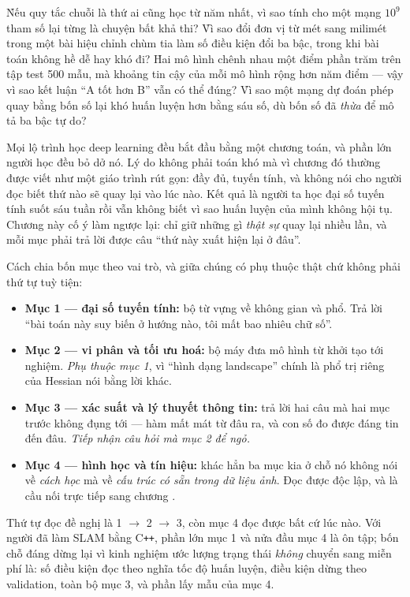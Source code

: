 \documentclass[../../deep_learning.tex]{subfiles}
\begin{document}
\begin{khoigoi}
\h{Nếu quy tắc chuỗi là thứ ai cũng học từ năm nhất, vì sao tính  cho một mạng \(10^9\) tham số lại từng là chuyện bất khả thi?}
\h{Vì sao đổi đơn vị từ mét sang milimét trong một bài hiệu chỉnh chùm tia làm số điều kiện đổi ba bậc, trong khi bài toán không hề dễ hay khó đi?}
\h{Hai mô hình chênh nhau một điểm phần trăm trên tập test 500 mẫu, mà khoảng tin cậy của mỗi mô hình rộng hơn năm điểm --- vậy vì sao kết luận ``A tốt hơn B'' vẫn có thể đúng?}
\h{Vì sao một mạng dự đoán phép quay bằng bốn số lại khó huấn luyện hơn bằng sáu số, dù bốn số đã \emph{thừa} để mô tả ba bậc tự do?}
\end{khoigoi}

Mọi lộ trình học deep learning đều bắt đầu bằng một chương toán, và phần lớn người học đều bỏ dở nó. Lý do không phải toán khó mà vì chương đó thường được viết như một giáo trình rút gọn: đầy đủ, tuyến tính, và không nói cho người đọc biết thứ nào sẽ quay lại vào lúc nào. Kết quả là người ta học đại số tuyến tính suốt sáu tuần rồi vẫn không biết vì sao huấn luyện của mình không hội tụ. Chương này cố ý làm ngược lại: chỉ giữ những gì \emph{thật sự} quay lại nhiều lần, và mỗi mục phải trả lời được câu ``thứ này xuất hiện lại ở đâu''.

Cách chia bốn mục theo vai trò, và giữa chúng có phụ thuộc thật chứ không phải thứ tự tuỳ tiện:

\begin{itemize}
\item \textbf{Mục 1 --- đại số tuyến tính:} bộ từ vựng về không gian và phổ. Trả lời ``bài toán này suy biến ở hướng nào, tôi mất bao nhiêu chữ số''.
\item \textbf{Mục 2 --- vi phân và tối ưu hoá:} bộ máy đưa mô hình từ khởi tạo tới nghiệm. \emph{Phụ thuộc mục 1}, vì ``hình dạng landscape'' chính là phổ trị riêng của Hessian nói bằng lời khác.
\item \textbf{Mục 3 --- xác suất và lý thuyết thông tin:} trả lời hai câu mà hai mục trước không đụng tới --- hàm mất mát từ đâu ra, và con số đo được đáng tin đến đâu. \emph{Tiếp nhận câu hỏi mà mục 2 để ngỏ.}
\item \textbf{Mục 4 --- hình học và tín hiệu:} khác hẳn ba mục kia ở chỗ nó không nói về \emph{cách học} mà về \emph{cấu trúc có sẵn trong dữ liệu ảnh}. Đọc được độc lập, và là cầu nối trực tiếp sang chương .
\end{itemize}

Thứ tự đọc đề nghị là 1 \(\rightarrow\) 2 \(\rightarrow\) 3, còn mục 4 đọc được bất cứ lúc nào. Với người đã làm SLAM bằng C\texttt{++}, phần lớn mục 1 và nửa đầu mục 4 là ôn tập; bốn chỗ đáng dừng lại vì kinh nghiệm ước lượng trạng thái \emph{không} chuyển sang miễn phí là: số điều kiện đọc theo nghĩa tốc độ huấn luyện, điều kiện dừng theo validation, toàn bộ mục 3, và phần lấy mẫu của mục 4.
\end{document}
